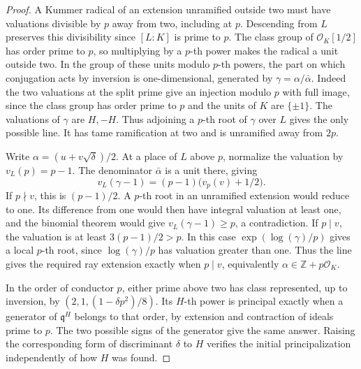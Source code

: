 \documentclass[11pt]{article}
\begin{document}
\begin{proof}
A Kummer radical of an extension unramified outside two must have
valuations divisible by \(p\) away from two, including at \(p\).
Descending from \(L\) preserves this divisibility since
\([L:K]\) is prime to \(p\). The class group of
\(\mathcal O_K[1/2]\) has order prime to \(p\), so multiplying by a
\(p\)-th power makes the radical a unit outside two. In the group
of these units modulo \(p\)-th powers, the part on which
conjugation acts by inversion is one-dimensional, generated by
\(\gamma=\alpha/\bar\alpha\). Indeed the two valuations at the split
prime give an injection modulo \(p\) with full image, since the
class group has order prime to \(p\) and the units of \(K\) are
\(\{\pm1\}\). The valuations of \(\gamma\) are \(H,-H\).
Thus adjoining a \(p\)-th root of \(\gamma\) over \(L\) gives the
only possible line. It has tame ramification at two and is
unramified away from \(2p\).

Write \(\alpha=(u+v\sqrt{\delta})/2\). At a place of \(L\) above
\(p\), normalize the valuation by \(v_L(p)=p-1\). The denominator
\(\bar\alpha\) is a unit there, giving
\[
               v_L(\gamma-1)=(p-1)\bigl(v_p(v)+1/2\bigr).
\]
If \(p\nmid v\), this is \((p-1)/2\). A \(p\)-th root in an
unramified extension would reduce to one. Its difference from one
would then have integral valuation at least one, and the binomial
theorem would give \(v_L(\gamma-1)\ge p\), a contradiction.
If \(p\mid v\), the valuation is at least \(3(p-1)/2>p\).
In this case \(\exp(\log(\gamma)/p)\) gives a local \(p\)-th root,
since \(\log(\gamma)/p\) has valuation greater than one. Thus the
line gives the required ray extension exactly when \(p\mid v\),
equivalently \(\alpha\in\mathbb Z+p\mathcal O_K\).

In the order of conductor \(p\), either prime above two has class
represented, up to inversion, by \((2,1,(1-\delta p^2)/8)\).
Its \(H\)-th power is principal exactly when a generator of
\(\mathfrak q^H\) belongs to that order, by extension and
contraction of ideals prime to \(p\). The two possible signs of
the generator give the same answer. Raising the corresponding
form of discriminant \(\delta\) to \(H\) verifies the initial
principalization independently of how \(H\) was found.
\end{proof}
\end{document}
